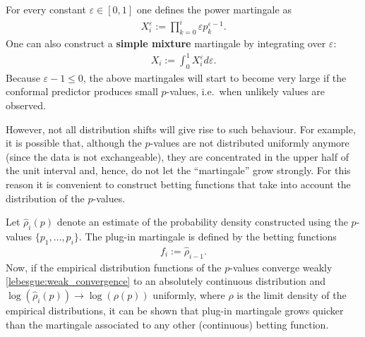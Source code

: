     \begin{method}
        For every constant $\varepsilon\in[0,1]$ one defines the power martingale as
        \begin{gather}
            X^\varepsilon_i := \prod_{k=0}^i\varepsilon p^{\varepsilon-1}_k.
        \end{gather}
        One can also construct a \textbf{simple mixture} martingale by integrating over $\varepsilon$:
        \begin{gather}
            X_i := \int_0^1X^\varepsilon_id\varepsilon.
        \end{gather}
        Because $\varepsilon-1\leq0$, the above martingales will start to become very large if the conformal predictor produces small $p$-values, i.e.~when unlikely values are observed.
    \end{method}
    However, not all distribution shifts will give rise to such behaviour. For example, it is possible that, although the $p$-values are not distributed uniformly anymore (since the data is not exchangeable), they are concentrated in the upper half of the unit interval and, hence, do not let the ``martingale'' grow strongly. For this reason it is convenient to construct betting functions that take into account the distribution of the $p$-values.
    \begin{method}
        Let $\hat{\rho}_i(p)$ denote an estimate of the probability density constructed using the $p$-values $\{p_1,\ldots,p_i\}$. The plug-in martingale is defined by the betting functions
        \begin{gather}
            f_i := \hat{\rho}_{i-1}.
        \end{gather}
        Now, if the empirical distribution functions of the $p$-values converge weakly \ref{lebesgue:weak_convergence} to an absolutely continuous distribution and $\log(\hat{\rho}_i(p))\longrightarrow\log(\rho(p))$ uniformly, where $\rho$ is the limit density of the empirical distributions, it can be shown that plug-in martingale grows quicker than the martingale associated to any other (continuous) betting function.
    \end{method}

